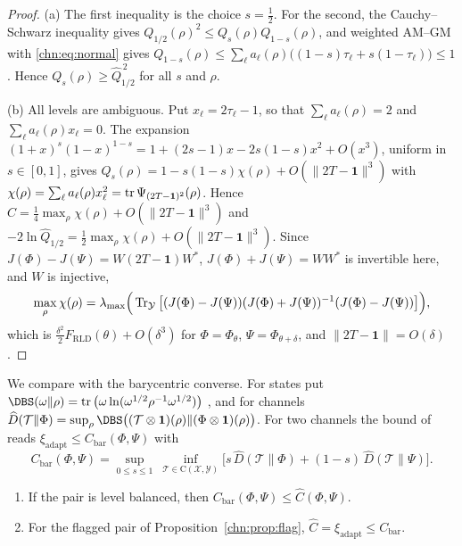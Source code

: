 \begin{proof}
(a) The first inequality is the choice $s=\tfrac12$. For the second, the Cauchy--Schwarz inequality gives $Q_{1/2}(\rho)^2\le Q_s(\rho)Q_{1-s}(\rho)$, and weighted AM--GM with \eqref{chn:eq:normal} gives $Q_{1-s}(\rho)\le\sum_\ell a_\ell(\rho)\big((1-s)\tau_\ell+s(1-\tau_\ell)\big)\le1$. Hence $Q_s(\rho)\ge\widehat Q_{1/2}^{\,2}$ for all $s$ and $\rho$.

(b) All levels are ambiguous. Put $x_\ell=2\tau_\ell-1$, so that $\sum_\ell a_\ell(\rho)=2$ and $\sum_\ell a_\ell(\rho)x_\ell=0$. The expansion $(1+x)^s(1-x)^{1-s}=1+(2s-1)x-2s(1-s)x^2+O(x^3)$, uniform in $s\in[0,1]$, gives $Q_s(\rho)=1-s(1-s)\chi(\rho)+O(\|2T-\mathbf 1\|^3)$ with $\chi(\rho)=\sum_\ell a_\ell(\rho)x_\ell^2=\operatorname{tr}\Psi_{(2T-\mathbf 1)^2}(\rho)$. Hence $\widehat C=\tfrac14\max_\rho\chi(\rho)+O(\|2T-\mathbf 1\|^3)$ and $-2\ln\widehat Q_{1/2}=\tfrac12\max_\rho\chi(\rho)+O(\|2T-\mathbf 1\|^3)$. Since $J(\Phi)-J(\Psi)=W(2T-\mathbf 1)W^*$, $J(\Phi)+J(\Psi)=WW^*$ is invertible here, and $W$ is injective,
\[
\max_\rho\chi(\rho)=\lambda_{\max}\Big(\operatorname{Tr}_{\mathcal Y}\big[(J(\Phi)-J(\Psi))(J(\Phi)+J(\Psi))^{-1}(J(\Phi)-J(\Psi))\big]\Big),
\]
which is $\frac{\delta^2}{2}F_{\mathrm{RLD}}(\theta)+O(\delta^3)$ for $\Phi=\Phi_\theta$, $\Psi=\Phi_{\theta+\delta}$, and $\|2T-\mathbf 1\|=O(\delta)$.
\end{proof}

We compare with the barycentric converse. For states put $\DBS(\omega\|\rho)=\tr\big(\omega\ln(\omega^{1/2}\rho^{-1}\omega^{1/2})\big)$ \cite{BelavkinStaszewski1982}, and for channels $\widehat D(\mathcal T\|\Phi)=\sup_\rho\DBS\big((\mathcal T\otimes\mathbf 1)(\rho)\|(\Phi\otimes\mathbf 1)(\rho)\big)$. For two channels the bound of \cite[Theorem~24]{JMMW2024} reads $\xi_{\mathrm{adapt}}\le C_{\mathrm{bar}}(\Phi,\Psi)$ with
\[
C_{\mathrm{bar}}(\Phi,\Psi)=\sup_{0\le s\le1}\ \inf_{\mathcal T\in\mathrm C(\mathcal X,\mathcal Y)}\Big[s\,\widehat D(\mathcal T\|\Phi)+(1-s)\,\widehat D(\mathcal T\|\Psi)\Big].
\]

\begin{proposition}\label{chn:prop:bary}
\begin{enumerate}
\item[(a)] If the pair is level balanced, then $C_{\mathrm{bar}}(\Phi,\Psi)\le\widehat C(\Phi,\Psi)$.
\item[(b)] For the flagged pair of Proposition~\ref{chn:prop:flag}, $\widehat C=\xi_{\mathrm{adapt}}\le C_{\mathrm{bar}}$.
\end{enumerate}
\end{proposition}

